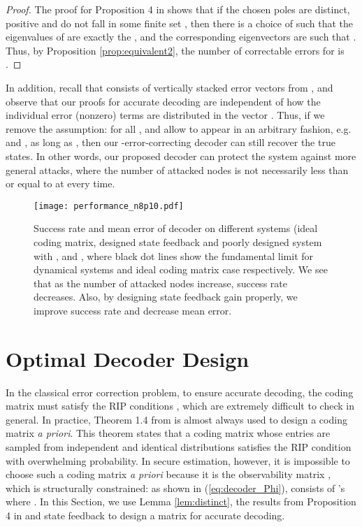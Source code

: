 \documentclass[journal]{IEEEtran}
\begin{document}
\begin{proof}
The proof for Proposition 4 in \cite{Fawzi2014} shows that if the chosen poles  are distinct, positive and do not fall in some finite set , then there is a choice of  such that the eigenvalues of  are exactly the , and the corresponding eigenvectors  are such that . Thus, by Proposition \ref{prop:equivalent2}, the number of correctable errors for  is .
\end{proof}





In addition, recall that  consists of vertically stacked error vectors from , and observe that our proofs for accurate decoding are independent of how the individual error (nonzero) terms are distributed in the vector . Thus, if we remove the assumption:  for all , and allow  to appear in an arbitrary fashion, e.g.  and , as long as , then our -error-correcting decoder can still recover the true states. In other words, our proposed decoder can protect the system against more general attacks, where the number of attacked nodes is not necessarily less than or equal to  at every time.











\begin{figure*}[!t]
\center
\texttt{[image: performance\_n8p10.pdf]}
\caption{Success rate and mean error of  decoder on different systems (ideal coding matrix, designed state feedback and poorly designed system with ,  and , where black dot lines show the fundamental limit for dynamical systems and ideal coding matrix case respectively. We see that as the number of attacked nodes increase, success rate decreases. Also, by designing state feedback gain properly, we improve success rate and decrease mean error. }
\label{fig:ex_n8p10}
\end{figure*}



\section{Optimal Decoder Design}\label{sec:design}
 
In the classical error correction problem, to ensure accurate decoding, the coding matrix must satisfy the RIP conditions  \cite{Candes_Tao}, which are extremely difficult to check in general. In practice, Theorem 1.4 from\cite{Candes_Tao} is almost always used to design a coding matrix {\it a priori}. This theorem states that a coding matrix whose entries are sampled from independent and identical distributions satisfies the RIP condition with overwhelming probability. 
In secure estimation, however, it is impossible to choose such a coding matrix {\it a priori} because it is the observability matrix , which is structurally constrained: as shown in (\ref{eq:decoder_Phi}),  consists of 's where . In this Section, we use Lemma \ref{lem:distinct}, the results from Proposition 4 in \cite{Fawzi2014} and state feedback to design a matrix  for accurate decoding. 
\end{document}
